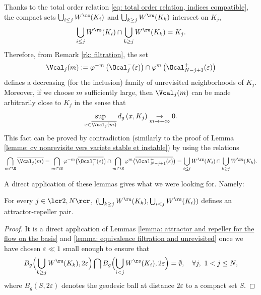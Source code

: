 \begin{remark}\label{rk: epsilon neighborhood proof below filtration}
Thanks to the total order relation \eqref{eq: total order relation, indices compatible}, the compact sets $\bigcup_{i \leq j} W^\rs (K_i)$ and $\bigcup_{k \geq j}W^\ru (K_k)$ intersect on $K_j$, \ie
\begin{equation}\label{eq: remark epsilon unrevisited neighborhoods}
\bigcup_{i \leq j}W^\rs (K_i) \cap \bigcup_{k \geq j}W^\ru (K_k) = K_j.
\end{equation}
Therefore, from Remark \ref{rk: filtration}, the set
\[
\Vcal_{j} (m):= \varphi^{-m}\left(\Ocal_j^- (\varepsilon) \right)\cap \varphi^m \left(\Ocal_{N-j+1}^+ (\varepsilon)\right)
\]
defines a decreasing (for the inclusion) family of unrevisited neighborhoods of $K_j$. Moreover, if we choose $m$ sufficiently large, then $\Vcal_j (m)$ can be made arbitrarily close to $K_j$ in the sense that
\[
\sup_{x \in \overline{\Vcal_{j} (m)}} d_g \left(x, K_j \right) \underset{m \to +\infty}{\to} 0.
\]
This fact can be proved by contradiction (similarly to the proof of Lemma \ref{lemme: cv nonrevisite vers variete stable et instable}) by using the relations
\[
\bigcap_{m \in \N} \overline{\Vcal_{j} (m)} = \bigcap_{m \in \N} \varphi^{-m}\bigl(\overline{\Ocal_j^- (\varepsilon)} \bigr) \cap \bigcap_{m \in \N} \varphi^m \bigl(\overline{\Ocal_{N-j+1}^+ (\varepsilon)}\bigr) = \bigcup_{i \leq j}W^\rs (K_i) \cap \bigcup_{k \geq j}W^\ru (K_k).
\]
\end{remark}

A direct application of these lemmas gives what we were looking for. Namely:

\begin{prop}\label{prop: attractor reppeler couple on the base}
For every $j\in\lcr2,N\rcr$, $(\bigcup_{k \geq j} W^\ru (K_k), \bigcup_{i < j}W^\rs (K_i))$ defines an attractor-repeller pair.
\end{prop}

\begin{proof}It is a direct application of Lemmas \ref{lemma: attractor and repeller for the flow on the basis} and \ref{lemma: equivalence filtration and unrevisited} once we have chosen $\varepsilon\ll 1$ small enough to ensure that
\[
B_g \Bigl(\bigcup_{k \geq j} W^\ru (K_k), 2\varepsilon \Bigr) \bigcap B_g \Bigl(\bigcup_{i < j} W^\rs (K_i), 2\varepsilon \Bigr) = \emptyset, \quad \forall j,\ 1 < j \leq N,
\]
where $B_g(S, 2\varepsilon)$ denotes the geodesic ball at distance $2\varepsilon$ to a compact set $S$.
\end{proof}

